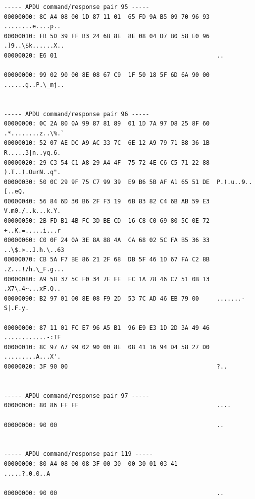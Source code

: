 \documentclass[bsc,frontabs,twoside,singlespacing,parskip,deptreport]{infthesis}     %
\begin{document}
\begin{appendices}
\begin{Verbatim}[commandchars=\\\{\}, fontsize=\small]
----- APDU command/response pair 95 -----
00000000: 8C A4 08 00 1D 87 11 01  65 FD 9A B5 09 70 96 93  ........e....p..
00000010: FB 5D 39 FF B3 24 6B 8E  8E 08 04 D7 B0 58 E0 96  .]9..\$k......X..
00000020: E6 01                                             ..

00000000: 99 02 90 00 8E 08 67 C9  1F 50 18 5F 6D 6A 90 00  ......g..P.\_mj..


----- APDU command/response pair 96 -----
00000000: 0C 2A 80 0A 99 87 81 89  01 1D 7A 97 D8 25 8F 60  .*........z..\%.`
00000010: 52 07 AE DC A9 AC 33 7C  6E 12 A9 79 71 B8 36 1B  R.....3|n..yq.6.
00000020: 29 C3 54 C1 A8 29 A4 4F  75 72 4E C6 C5 71 22 88  ).T..).OurN..q".
00000030: 50 0C 29 9F 75 C7 99 39  E9 B6 5B AF A1 65 51 DE  P.).u..9..[..eQ.
00000040: 56 84 6D 30 B6 2F F3 19  6B 83 82 C4 6B AB 59 E3  V.m0./..k...k.Y.
00000050: 2B FD B1 4B FC 3D BE CD  16 C8 C0 69 80 5C 0E 72  +..K.=.....i...r
00000060: C0 0F 24 0A 3E 8A 88 4A  CA 68 02 5C FA B5 36 33  ..\$.>..J.h.\..63
00000070: CB 5A F7 BE 86 21 2F 68  DB 5F 46 1D 67 FA C2 8B  .Z...!/h.\_F.g...
00000080: A9 58 37 5C F0 34 7E FE  FC 1A 78 46 C7 51 0B 13  .X7\.4~...xF.Q..
00000090: B2 97 01 00 8E 08 F9 2D  53 7C AD 46 EB 79 00     .......-S|.F.y.

00000000: 87 11 01 FC E7 96 A5 B1  96 E9 E3 1D 2D 3A 49 46  ............-:IF
00000010: 8C 97 A7 99 02 90 00 8E  08 41 16 94 D4 58 27 D0  .........A...X'.
00000020: 3F 90 00                                          ?..


----- APDU command/response pair 97 -----
00000000: 80 86 FF FF                                       ....

00000000: 90 00                                             ..


----- APDU command/response pair 119 -----
00000000: 80 A4 08 00 08 3F 00 30  00 30 01 03 41           .....?.0.0..A

00000000: 90 00                                             ..



\end{Verbatim}
\end{appendices}
\end{document}
